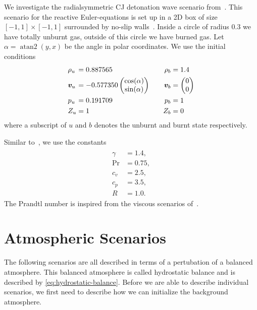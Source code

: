 We investigate the radialsymmetric CJ detonation wave scenario from~\cite{helzel2000modified}.
This scenario for the reactive Euler-equations is set up in a 2D box of size $[-1, 1] \times [-1, 1]$ surrounded by no-slip walls~.
Inside a circle of radius $0.3$ we have totally unburnt gas, outside of this circle we have burned gas.
Let $\alpha =  \operatorname{atan2}(y,x)$ be the angle in polar coordinates.
We use the initial conditions
\begin{equation}
\begin{alignedat}{6}
  & \rho_u &&= 0.887565 \qquad& \rho_b &= 1.4\\
  & \bm{v}_u &&= -0.577350
  \begin{pmatrix}
     \cos (\alpha)\\
     \sin (\alpha)
   \end{pmatrix}  \qquad& \bm{v}_b  &=
   \begin{pmatrix}
     0 \\
     0
   \end{pmatrix}\\
   & p_u &&=0.191709 \qquad& p_b &= 1\\
   & Z_u &&= 1 \quad& Z_b &= 0
  \end{alignedat}
\end{equation}
where a subscript of $u$ and $b$ denotes the unburnt and burnt state respectively.

Similar to~\cite{helzel2000modified}, we use the constants
\begin{align}
  \begin{split}
  \gamma &= 1.4, \\
  \Pr &= 0.75, \\
  c_v &= 2.5, \\
  c_p &= 3.5, \\
  R &= 1.0.
  \end{split}
\end{align}
The Prandtl number is inspired from the viscous scenarios of~\cite{hidalgo2011ader}.

\section{Atmospheric Scenarios}
The following scenarios are all described in terms of a pertubation of a balanced atmosphere.
This balanced atmosphere is called hydrostatic balance and is described by \cref{eq:hydrostatic-balance}.
Before we are able to describe individual scenarios, we first need to describe how we can initialize the background atmosphere.


